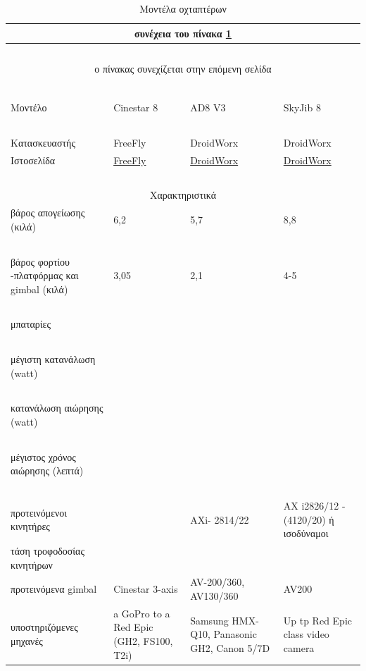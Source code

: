 \documentclass[a4paper, 12pt, twoside]{report}
\begin{document}
{{{{{{\begin{landscape}
			\begin{longtable} { m{3cm} m{3.5cm} m{3.5cm} m{3.5cm} }
					\caption [Μοντέλα οχταπτέρων]{Μοντέλα οχταπτέρων}
					\label{πιν.:Μοντέλα οχταπτέρων}\\
					\hline
					\endfirsthead
					\multicolumn{4}{c}{συνέχεια του πίνακα \ref{πιν.:Μοντέλα οχταπτέρων}}\\
					\hline
					~\\
					\endhead
					\hline
					\multicolumn{4}{c}{ο πίνακας συνεχίζεται στην επόμενη σελίδα}\\
					\endfoot
					\multicolumn{4}{c}{ολοκληρώθηκε ο πίνακας \ref{πιν.:Μοντέλα οχταπτέρων}}\\
					\endlastfoot
					~\\
					Μοντέλο & Cinestar 8 & AD8 V3 & SkyJib 8\\
					\hdashline
					~\\
					Κατασκευαστής & FreeFly & DroidWorx & DroidWorx\\
					Ιστοσελίδα & \href{http://www.freeflysystems.com/products/cinestar-8.php}{FreeFly}  & \href{http://www.droidworx.com.au/ADseries.html}{DroidWorx} & \href{http://www.droidworx.com.au/skyjib.html}{DroidWorx}\\
					\hdashline
					~\\
					\multicolumn{4}{c}{Χαρακτηριστικά}\\
					\hdashline
					βάρος απογείωσης (κιλά) & 6,2 & 5,7 & 8,8\\
					~\\
					βάρος φορτίου -πλατφόρμας και gimbal (κιλά) & 3,05  & 2,1 & 4-5\\
					~\\
					μπαταρίες & & &\\
					~\\
					μέγιστη κατανάλωση (watt) & & &\\
					~\\
					κατανάλωση αιώρησης (watt) & & &\\
					~\\
					μέγιστος χρόνος αιώρησης (λεπτά) & & &\\
					~\\
					προτεινόμενοι κινητήρες & & AXi- 2814/22 & AX i2826/12 - (4120/20) ή ισοδύναμοι\\
					τάση τροφοδοσίας κινητήρων &  & &\\
					προτεινόμενα gimbal & Cinestar 3-axis & AV-200/360, AV130/360 & AV200\\
					υποστηριζόμενες μηχανές  & a GoPro to a Red Epic (GH2, FS100, T2i) & Samsung HMX-Q10, Panasonic GH2, Canon 5/7D & Up tp Red Epic class video camera\\
					\hline
				\end{longtable}
				\end{landscape}	
			
}}}}}}
\end{document}
